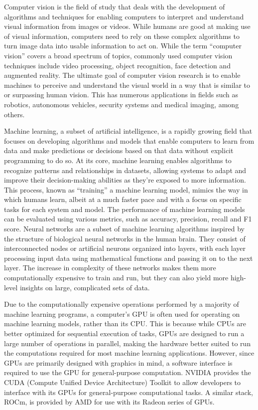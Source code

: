 \documentclass[titlepage,draft]{article}
\begin{document}
Computer vision is the field of study that deals with the development of algorithms and techniques for enabling computers
to interpret and understand visual information from images or videos.
While humans are good at making use of visual information, computers need to rely on these complex algorithms to turn image
data into usable information to act on.
While the term ``computer vision'' covers a broad spectrum of topics, commonly used computer vision techniques include video
processing, object recognition, face detection and augmented reality.
The ultimate goal of computer vision research is to enable machines to perceive and understand the visual world in a way that
is similar to or surpassing human vision.
This has numerous applications in fields such as robotics, autonomous vehicles, security systems and medical imaging, among
others.

Machine learning, a subset of artificial intelligence, is a rapidly growing field that focuses on developing algorithms and
models that enable computers to learn from data and make predictions or decisions based on that data without explicit programming
to do so.
At its core, machine learning enables algorithms to recognize patterns and relationships in datasets, allowing systems to adapt
and improve their decision-making abilities as they're exposed to more information.
This process, known as ``training'' a machine learning model, mimics the way in which humans learn, albeit at a much faster pace
and with a focus on specific tasks for each system and model.
The performance of machine learning models can be evaluated using various metrics, such as accuracy, precision, recall and F1
score.
Neural networks are a subset of machine learning algorithms inspired by the structure of biological neural networks in the human
brain.
They consist of interconnected nodes or artificial neurons organized into layers, with each layer processing input data using
mathematical functions and passing it on to the next layer.
The increase in complexity of these networks makes them more computationally expensive to train and run, but they can also yield
more high-level insights on large, complicated sets of data.

Due to the computationally expensive operations performed by a majority of machine learning programs, a computer's GPU is often
used for operating on machine learning models, rather than its CPU.
This is because while CPUs are better optimized for sequential execution of tasks, GPUs are designed to run a large number of
operations in parallel, making the hardware better suited to run the computations required for most machine learning applications.
However, since GPUs are primarily designed with graphics in mind, a software interface is required to use the GPU for
general-purpose computation.
NVIDIA provides the CUDA (Compute Unified Device Architecture) Toolkit \cite{CUDA} to allow developers to interface with its
GPUs for general-purpose computational tasks.
A similar stack, ROCm, is provided by AMD for use with its Radeon series of GPUs. \cite{ROCm}
\end{document}
